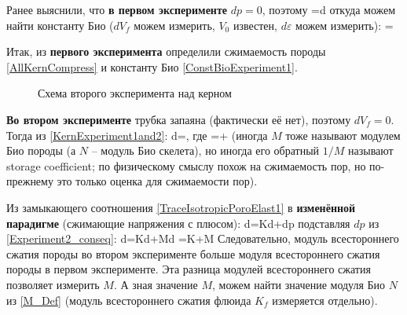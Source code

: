 \documentclass[main.tex]{subfiles}
\begin{document}
Ранее выяснили, что \textbf{в первом эксперименте} $dp=0$, поэтому
\beq
{}=\alpha d\varepsilon
\eeq
откуда можем найти константу Био ($dV_f$ можем измерить, $V_0$ известен, $d\varepsilon$ можем измерить):
\beq\label{ConstBioExperiment1}
\alpha=
\eeq

Итак, из \textbf{первого эксперимента} определили сжимаемость породы \eqref{AllKernCompress} и константу Био \eqref{ConstBioExperiment1}.

\begin{figure}[h]
\centering
{}
\caption{Схема второго эксперимента над керном}
\end{figure}

\textbf{Во втором эксперименте} трубка запаяна (фактически её нет), поэтому $dV_f=0$. Тогда из \eqref{KernExperiment1and2}:
\beq\label{Experiment2_conseq}
\alpha d\varepsilon=,
\eeq
где
\beq\label{M_Def}
=+
\eeq
(иногда $M$ тоже называют модулем Био породы (а $N$ -- модуль Био скелета), но иногда его обратный $1/M$ называют storage coefficient; по физическому смыслу похож на сжимаемость пор, но по-прежнему это только оценка для сжимаемости пор).

Из замыкающего соотношения \eqref{TraceIsotropicPoroElast1} в \textbf{изменённой парадигме} (сжимающие напряжения с плюсом):
\beq
d\sigma=Kd\varepsilon+\alpha dp
\eeq
подставляя $dp$ из \eqref{Experiment2_conseq}:
\beq
d\sigma=Kd\varepsilon+\alpha Md\varepsilon
\eeq
\beq\label{K_FOR_Experiment2}
=K+\alpha M
\eeq
Следовательно, модуль всестороннего сжатия породы во втором эксперименте больше модуля всестороннего сжатия породы в первом эксперименте. Эта разница модулей всестороннего сжатия позволяет измерить $M$. А зная значение $M$, можем найти значение модуля Био $N$ из \eqref{M_Def} (модуль всестороннего сжатия флюида $K_f$ измеряется отдельно).
\end{document}

